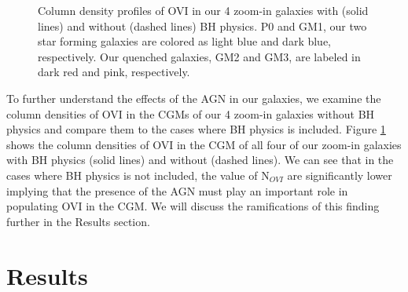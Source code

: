\documentclass[]{emulateapj}
\begin{document}
\begin{figure}[h!]
\centerline{}
\caption[]{Column density profiles of OVI in our 4 zoom-in galaxies with (solid lines) and without (dashed lines) BH physics. P0 and GM1, our two star forming galaxies are colored as light blue and dark blue, respectively. Our quenched galaxies, GM2 and GM3, are labeled in dark red and pink, respectively.}
\label{GMandNOBH_Novi_vs_b}
\end{figure}

To further understand the effects of the AGN in our galaxies, we examine the column densities of OVI in the CGMs of our 4 zoom-in galaxies without BH physics and compare them to the cases where BH physics is included. Figure \ref{GMandNOBH_Novi_vs_b} shows the column densities of OVI in the CGM of all four of our zoom-in galaxies with BH physics (solid lines) and without (dashed lines). We can see that in the cases where BH physics is not included, the value of N$_{OVI}$ are significantly lower implying that the presence of the AGN must play an important role in populating OVI in the CGM. We will discuss the ramifications of this finding further in the Results section.




\section{Results} \label{results}
\end{document}
